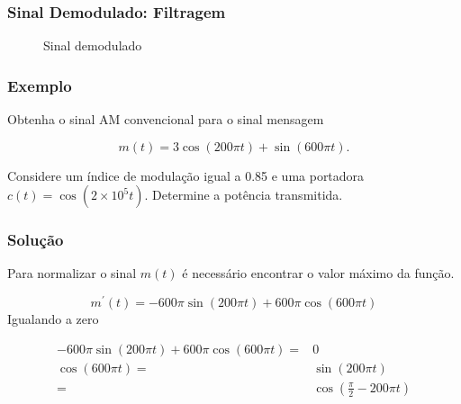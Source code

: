 \documentclass[10pt,hyperref={pdfpagemode=FullScreen},aspectratio=169]{beamer}
\begin{document}
\begin{frame}
  \frametitle{Sinal Demodulado: Filtragem}

  \begin{figure}[h!]
    \begin{center}
      \caption{Sinal demodulado}
    \end{center}
  \end{figure}

\end{frame}

\begin{frame}
  \frametitle{Exemplo}

  Obtenha o sinal AM convencional para o sinal mensagem 

$$
m(t) = 3\cos(200\pi t) + \sin(600\pi t).
$$

Considere um índice de modulação igual a 0.85 e uma portadora $c(t) = \cos(2 \times 10^5t)$. Determine a potência transmitida.

\end{frame}

\begin{frame}
  \frametitle{Solução}

  Para normalizar o sinal $m(t)$ é necessário encontrar o valor máximo da função.

$$
m^{\prime}(t) = -600\pi\sin(200\pi t) + 600\pi\cos(600\pi t)
$$
Igualando a zero


\begin{align*}
   -600\pi\sin(200\pi t) + 600\pi\cos(600\pi t) = & 0 \\
   \cos(600\pi t) = & \sin(200\pi t)\\
                  = &  \cos(\frac{\pi}{2} - 200\pi t)
\end{align*}

\end{frame}
\end{document}
